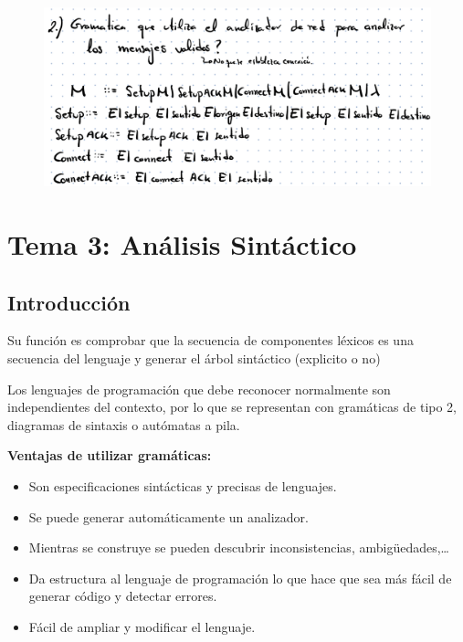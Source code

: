 \documentclass[12pt, twoside, openright]{report} %
\begin{document}
\begin{figure}[H]
	{\includegraphics[scale=.3]{image-20210305192731385.png}}
\end{figure}

\chapter{Tema 3: Análisis Sintáctico}


\section{Introducción}

Su función es comprobar que la secuencia de componentes léxicos es una
secuencia del lenguaje y generar el árbol sintáctico (explicito o no)

Los lenguajes de programación que debe reconocer normalmente son
independientes del contexto, por lo que se representan con gramáticas de
tipo 2, diagramas de sintaxis o autómatas a pila.

\textbf{Ventajas de utilizar gramáticas:}

\begin{itemize}

\item
  Son especificaciones sintácticas y precisas de lenguajes.
\item
  Se puede generar automáticamente un analizador.
\item
  Mientras se construye se pueden descubrir inconsistencias,
  ambigüedades,\ldots{}
\item
  Da estructura al lenguaje de programación lo que hace que sea más
  fácil de generar código y detectar errores.
\item
  Fácil de ampliar y modificar el lenguaje.
\end{itemize}
\end{document}
